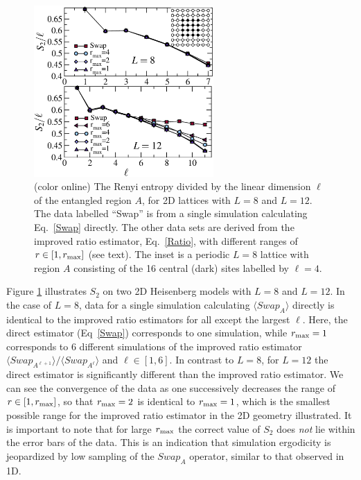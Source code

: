 \documentclass[prl,aps,twocolumn,floatfix,amsmath,amssymb,superscriptaddress,tightenlines]{revtex4}
\begin{document}
\begin{figure} {
\includegraphics[width=2.7in]{L8n12_ratio.eps} \caption{(color online) 
\label{L16fig}
The Renyi entropy divided by the linear dimension $\ell$ of the entangled region $A$, for 2D lattices with $L=8$ and $L=12$.  The data labelled ``Swap'' is from a single simulation calculating Eq.~\eqref{Swap} directly.  The other
data sets are derived from the improved ratio estimator, Eq.~\eqref{Ratio}, with different ranges of $r \in [1,r_{\rm max}]$ (see text).  The inset 
is a periodic $L=8$ lattice with region $A$ consisting of the 16 central (dark) sites labelled by $\ell = 4$.
}
} \end{figure}

Figure \ref{L16fig} illustrates $S_2$ on two 2D Heisenberg models with  $L=8$ and  $L=12$.  In the case of $L=8$, data for a single 
simulation calculating $\langle Swap_A \rangle$ directly is identical to the improved ratio estimators for all except the largest $\ell$.  
Here, the direct estimator (Eq~\eqref{Swap}) corresponds to one simulation, while $r_{\rm max}=1$ corresponds to 6 different simulations of the improved ratio estimator ${\langle Swap_{A^{\ell+1}}\rangle}/{\langle Swap_{A^{\ell}}\rangle}$ and $\ell \in [1,6]$.
In contrast to $L=8$, for $L=12$ the direct estimator is significantly different than 
the improved ratio estimator.  We can see the convergence of the data as one successively decreases the range of $r \in [1,r_{\rm max}]$, 
so that $r_{\rm max}=2$ is identical to $r_{\rm max}=1$, which is the smallest possible range for the improved ratio estimator in the 2D geometry illustrated.  It is important to note that for large $r_{\rm max}$ the correct value of $S_2$ does {\it not} lie within the error bars of the data.  
This is an indication that simulation ergodicity is jeopardized by low sampling of the $Swap_A$ operator, similar to that observed in 1D.
\end{document}
